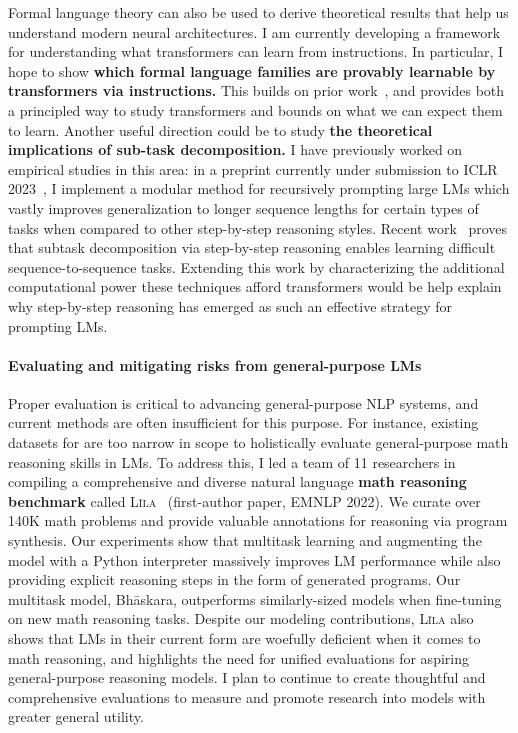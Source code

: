 \documentclass[11pt]{article}
\newcommand\lila{\textsc{L\={\i}la}\xspace}
\begin{document}
Formal language theory can also be used to derive theoretical results 
that help us understand modern neural architectures. 
I am currently developing a framework for 
understanding what transformers can learn from instructions. 
In particular, I hope to show \textbf{which formal language families 
are provably learnable by transformers 
via instructions.}
This builds on prior work~\cite{Merrill2022LogPrecisionTA},
and provides both a principled way to study transformers 
and bounds on what we can expect them to learn.
Another useful direction could be to study
\textbf{the theoretical implications of sub-task decomposition.}
I have previously worked on empirical studies in this area:
in a preprint currently under submission 
to ICLR 2023~\cite{Khot2022DecomposedPA},
I implement a modular method for recursively prompting large LMs 
which vastly improves generalization to longer sequence lengths 
for certain types of tasks 
when compared to other step-by-step reasoning styles.
Recent work~\cite{Wies2022SubTaskDE} 
proves that subtask decomposition
via step-by-step reasoning
enables learning difficult sequence-to-sequence tasks.
Extending this work
by characterizing the additional computational power 
these techniques afford transformers
would be help explain why step-by-step reasoning 
has emerged as such an effective strategy for prompting LMs.

\paragraph{Evaluating and mitigating risks from general-purpose LMs}
Proper evaluation is critical to advancing general-purpose NLP systems,
and current methods are often insufficient for this purpose.
For instance, existing datasets for are too narrow in scope 
to holistically evaluate general-purpose math reasoning skills in LMs.
To address this,
I led a team of 11 researchers in compiling a
comprehensive and diverse natural language 
\textbf{math reasoning benchmark} 
called \lila~\cite{Mishra2022LilaAU} (first-author paper, EMNLP 2022).
We curate over 140K math problems
and provide valuable annotations for reasoning via program synthesis. 
Our experiments show that multitask learning 
and augmenting the model with a Python interpreter
massively improves LM performance 
while also providing explicit reasoning steps in the form of generated programs.
Our multitask model, Bh\=askara, 
outperforms similarly-sized models
when fine-tuning on new math reasoning tasks.
Despite our modeling contributions, \lila also shows that LMs 
in their current form 
are woefully deficient when it comes to math reasoning,
and highlights the need for unified evaluations for 
aspiring general-purpose reasoning models.
I plan to continue to create thoughtful and comprehensive evaluations 
to measure and promote research into models with greater general utility.
\end{document}
